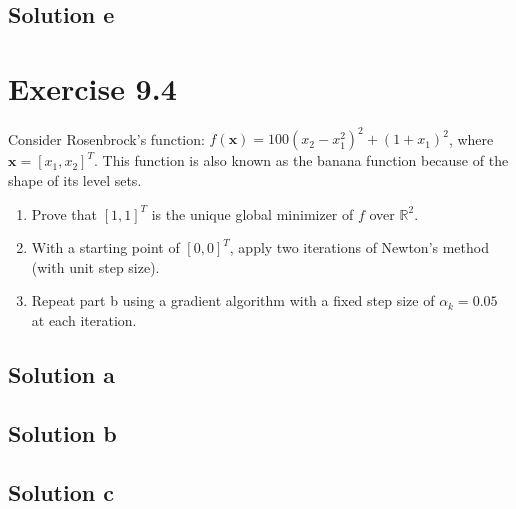 \documentclass{article}
\newcommand{\bld}[1]{\boldsymbol{#1}}
\begin{document}
\subsection*{Solution e}
\section*{Exercise 9.4}
Consider Rosenbrock's function: $f(\bld{x})=100(x_2-x_1^2)^2+(1+x_1)^2$, where
$\bld{x}=[x_1,x_2]^T$. This function is also known as the banana function because of the shape of its level sets.
\begin{enumerate}[label=\alph*.]
\item Prove that $[1,1]^T$ is the unique global minimizer of $f$ over
	$\mathbb{R}^2$.
\item With a starting point of $[0,0]^T$, apply two iterations of Newton's
	method (with unit step size).
\item Repeat part b using a gradient algorithm with a fixed step size of
	$\alpha_k=0.05$ at each iteration.
\end{enumerate}
\subsection*{Solution a}
\subsection*{Solution b}
\subsection*{Solution c}
\end{document}
